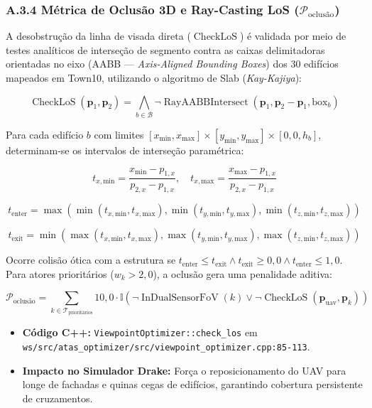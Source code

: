 \documentclass[
  brazilian,
  a4paper]{article}
\providecommand{\tightlist}{%
  \setlength{\itemsep}{0pt}\setlength{\parskip}{0pt}}
\begin{document}
\subsubsection{\texorpdfstring{A.3.4 Métrica de Oclusão 3D e Ray-Casting
LoS
(\(\mathcal{P}_{\text{oclusão}}\))}{A.3.4 Métrica de Oclusão 3D e Ray-Casting LoS (\textbackslash mathcal\{P\}\_\{\textbackslash text\{oclusão\}\})}}\label{a.3.4-muxe9trica-de-oclusuxe3o-3d-e-ray-casting-los-mathcalp_textoclusuxe3o}

A desobstrução da linha de visada direta (\(\operatorname{CheckLoS}\)) é
validada por meio de testes analíticos de interseção de segmento contra
as caixas delimitadoras orientadas no eixo (AABB --- \emph{Axis-Aligned
Bounding Boxes}) dos 30 edifícios mapeados em Town10, utilizando o
algoritmo de Slab (\emph{Kay-Kajiya}):

\[\operatorname{CheckLoS}(\mathbf{p}_1, \mathbf{p}_2) = \bigwedge_{b \in \mathcal{B}} \neg \operatorname{RayAABBIntersect}(\mathbf{p}_1, \mathbf{p}_2 - \mathbf{p}_1, \text{box}_b)\]

Para cada edifício \(b\) com limites
\([x_{\text{min}}, x_{\text{max}}] \times [y_{\text{min}}, y_{\text{max}}] \times [0{,}0, h_b]\),
determinam-se os intervalos de interseção paramétrica:

\[t_{x,\text{min}} = \frac{x_{\text{min}} - p_{1,x}}{p_{2,x} - p_{1,x}}, \quad t_{x,\text{max}} = \frac{x_{\text{max}} - p_{1,x}}{p_{2,x} - p_{1,x}}\]

\[t_{\text{enter}} = \max\left(\min(t_{x,\text{min}}, t_{x,\text{max}}), \min(t_{y,\text{min}}, t_{y,\text{max}}), \min(t_{z,\text{min}}, t_{z,\text{max}})\right)\]

\[t_{\text{exit}} = \min\left(\max(t_{x,\text{min}}, t_{x,\text{max}}), \max(t_{y,\text{min}}, t_{y,\text{max}}), \max(t_{z,\text{min}}, t_{z,\text{max}})\right)\]

Ocorre colisão ótica com a estrutura se
\(t_{\text{enter}} \le t_{\text{exit}} \land t_{\text{exit}} \ge 0{,}0 \land t_{\text{enter}} \le 1{,}0\).
Para atores prioritários (\(w_k > 2{,}0\)), a oclusão gera uma
penalidade aditiva:

\[\mathcal{P}_{\text{oclusão}} = \sum_{k \in \mathcal{T}_{\text{prioritários}}} 10{,}0 \cdot \mathbb{I}\left(\neg \operatorname{InDualSensorFoV}(k) \lor \neg \operatorname{CheckLoS}(\mathbf{p}_{\text{uav}}, \mathbf{p}_k)\right)\]

\begin{itemize}
\tightlist
\item
  \textbf{Código C++:} \texttt{ViewpointOptimizer:\allowbreak{}:\allowbreak{}check\_\allowbreak{}los} em
  \texttt{ws/\allowbreak{}src/\allowbreak{}atas\_\allowbreak{}optimizer/\allowbreak{}src/\allowbreak{}viewpoint\_\allowbreak{}optimizer.\allowbreak{}cpp:\allowbreak{}85-113}.
\item
  \textbf{Impacto no Simulador Drake:} Força o reposicionamento do UAV
  para longe de fachadas e quinas cegas de edifícios, garantindo
  cobertura persistente de cruzamentos.
\end{itemize}
\end{document}
